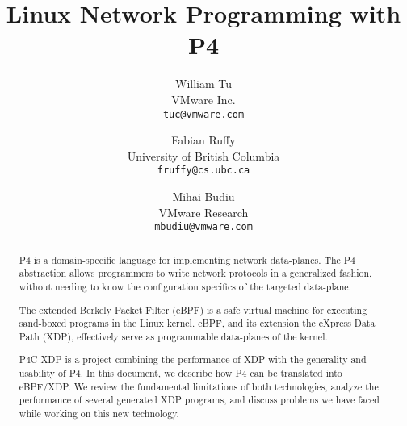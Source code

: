 \documentclass[9pt,twocolumn,times]{article}
\title{Linux Network Programming with P4}
\author{William Tu\\
  VMware Inc.\\
  \texttt{tuc@vmware.com}
  \and
  Fabian Ruffy\\
  University of British Columbia\\
  \texttt{fruffy@cs.ubc.ca}
  \and
  Mihai Budiu\\
  VMware Research\\
  \texttt{mbudiu@vmware.com}
}
\date{}
\begin{document}
\maketitle

\begin{abstract}
  P4 is a domain-specific language for implementing network data-planes.
  The P4 abstraction allows programmers to write network protocols in a 
  generalized fashion, without needing to know the configuration specifics
  of the targeted data-plane.
  
  The extended Berkely Packet Filter (eBPF) is a safe virtual machine for 
  executing sand-boxed programs in the Linux kernel. eBPF, and its extension 
  the eXpress Data Path (XDP), effectively serve as programmable data-planes of 
  the kernel.

  P4C-XDP is a project combining the performance of XDP with the generality and 
  usability of P4. In this document, we describe how P4 can be 
  translated into eBPF/XDP. We review the fundamental limitations of both 
  technologies, analyze the performance of several generated XDP programs, and 
  discuss problems we have faced while working on this new technology.
  
\end{abstract}











\end{document}
